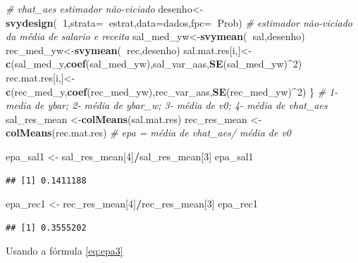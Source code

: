 \documentclass[]{book}
\newenvironment{Shaded}{\begin{snugshade}}{\end{snugshade}}
\newcommand{\KeywordTok}[1]{\textcolor[rgb]{0.13,0.29,0.53}{\textbf{#1}}}
\newcommand{\DataTypeTok}[1]{\textcolor[rgb]{0.13,0.29,0.53}{#1}}
\newcommand{\DecValTok}[1]{\textcolor[rgb]{0.00,0.00,0.81}{#1}}
\newcommand{\StringTok}[1]{\textcolor[rgb]{0.31,0.60,0.02}{#1}}
\newcommand{\CommentTok}[1]{\textcolor[rgb]{0.56,0.35,0.01}{\textit{#1}}}
\newcommand{\OperatorTok}[1]{\textcolor[rgb]{0.81,0.36,0.00}{\textbf{#1}}}
\newcommand{\NormalTok}[1]{#1}
\theoremstyle{definition}
\theoremstyle{definition}
\theoremstyle{definition}
\theoremstyle{remark}
\begin{document}
\begin{Shaded}
\begin{Highlighting}[]
\CommentTok{# vhat_aes estimador não-viciado}
\NormalTok{desenho<-}\KeywordTok{svydesign}\NormalTok{(}\OperatorTok{~}\DecValTok{1}\NormalTok{,}\DataTypeTok{strata=}\OperatorTok{~}\NormalTok{estrat,}\DataTypeTok{data=}\NormalTok{dados,}\DataTypeTok{fpc=}\OperatorTok{~}\NormalTok{Prob)}
\CommentTok{# estimador não-viciado da média de  salario e receita}
\NormalTok{sal_med_yw<-}\KeywordTok{svymean}\NormalTok{(}\OperatorTok{~}\NormalTok{sal,desenho) }
\NormalTok{rec_med_yw<-}\KeywordTok{svymean}\NormalTok{(}\OperatorTok{~}\NormalTok{rec,desenho)}
\NormalTok{sal.mat.res[i,]<-}\KeywordTok{c}\NormalTok{(sal_med_y,}\KeywordTok{coef}\NormalTok{(sal_med_yw),sal_var_aas,}\KeywordTok{SE}\NormalTok{(sal_med_yw)}\OperatorTok{^}\DecValTok{2}\NormalTok{)}
\NormalTok{rec.mat.res[i,]<-}\KeywordTok{c}\NormalTok{(rec_med_y,}\KeywordTok{coef}\NormalTok{(rec_med_yw),rec_var_aas,}\KeywordTok{SE}\NormalTok{(rec_med_yw)}\OperatorTok{^}\DecValTok{2}\NormalTok{)}
\NormalTok{\}}
\CommentTok{# 1-media de ybar; 2- média de ybar_w; 3- média de v0; 4- média de vhat_aes}
\NormalTok{sal_res_mean <-}\KeywordTok{colMeans}\NormalTok{(sal.mat.res)}
\NormalTok{rec_res_mean <-}\StringTok{ }\KeywordTok{colMeans}\NormalTok{(rec.mat.res)}
\CommentTok{# epa = média de vhat_aes/ média de v0}

\NormalTok{epa_sal1 <-}\StringTok{ }\NormalTok{sal_res_mean[}\DecValTok{4}\NormalTok{]}\OperatorTok{/}\NormalTok{sal_res_mean[}\DecValTok{3}\NormalTok{]}
\NormalTok{epa_sal1}
\end{Highlighting}
\end{Shaded}

\begin{verbatim}
## [1] 0.1411188
\end{verbatim}

\begin{Shaded}
\begin{Highlighting}[]
\NormalTok{epa_rec1 <-}\StringTok{ }\NormalTok{rec_res_mean[}\DecValTok{4}\NormalTok{]}\OperatorTok{/}\NormalTok{rec_res_mean[}\DecValTok{3}\NormalTok{]}
\NormalTok{epa_rec1}
\end{Highlighting}
\end{Shaded}

\begin{verbatim}
## [1] 0.3555202
\end{verbatim}

Usando a fórmula \eqref{eq:epa3}
\end{document}
